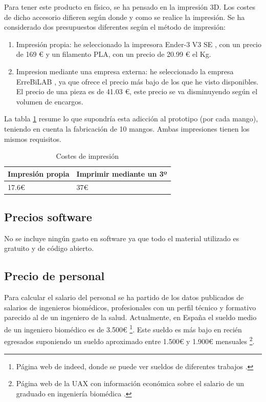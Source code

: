 Para tener este producto en físico, se ha pensado en la impresión 3D. Los costes de dicho accesorio difieren según donde y como se realice la impresión. 
Se ha considerado dos presupuestos diferentes según el método de impresión:
\begin{enumerate}
    \item Impresión propia: he seleccionado la impresora Ender-3 V3 SE \cite{Ender-3}, con un precio de 169 € y un filamento PLA\cite{PLA}, con un precio de 20.99 € el Kg. 
    \item Impresion mediante una empresa externa: he seleccionado la empresa ErreBiLAB \cite{ErreBiLAB}, ya que ofrece el precio más bajo de los que he visto disponibles. El precio de una pieza es de 41.03 €, este precio se va disminuyendo según el volumen de encargos. 
\end{enumerate}

La tabla \ref{tab:Impresión} resume lo que supondría esta adicción al prototipo (por cada mango), teniendo en cuenta la fabricación de 10 mangos. 
Ambas impresiones tienen los mismos requisitos.
\begin{table}[h] 
    \centering
    \begin{tabular}{|l|l|}
    \hline
    \rowcolor[HTML]{BFBFBF} 
    \textbf{Impresión propia} & \textbf{Imprimir mediante un 3º} \\ \hline
     17.6€ & 37€  \\ \hline
    \end{tabular}
    \caption{Costes de impresión}
    \label{tab:Impresión}
\end{table}

\subsection{Precios software}
No se incluye ningún gasto en software ya que todo el material utilizado es gratuito y de código abierto.

\subsection{Precio de personal}
Para calcular el salario del personal se ha partido de los datos publicados de salarios de ingenieros biomédicos, profesionales con un perfil técnico y formativo parecido al de un ingeniero de la salud.
Actualmente, en España el sueldo medio de un ingeniero biomédico es de 3.500€ \cite{SueldoBioing}\footnote{Página web de indeed, donde se puede ver sueldos de diferentes trabajos \cite{SueldoBioing}.}\cite{SUELDO}. Este sueldo es más bajo en recién egresados suponiendo un sueldo aproximado entre 1.500€ y 1.900€ mensuales \cite{Sueldo_egresado}\footnote{Página web de la UAX con información económica sobre el salario de un graduado en ingeniería biomédica \cite{Sueldo_egresado}.}.



